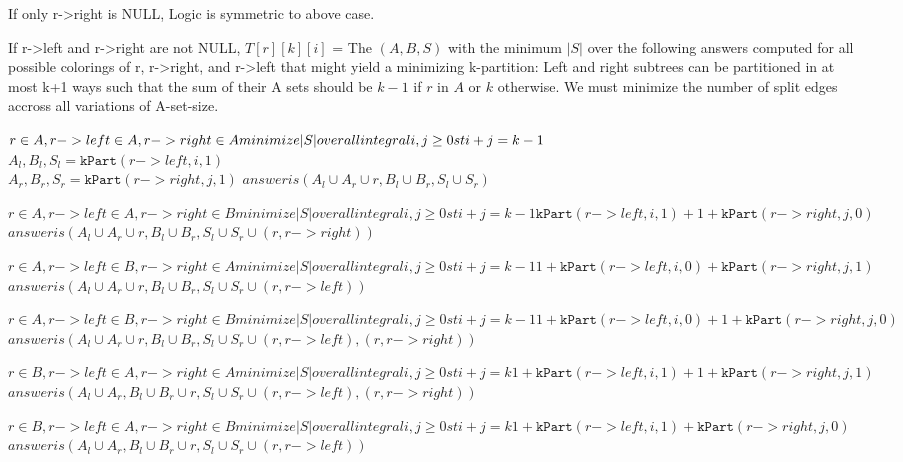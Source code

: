 \documentclass[11pt]{article}
\begin{document}
    If only r->right is NULL,
        Logic is symmetric to above case.

    If r->left and r->right are not NULL,
        $T[r][k][i]$ = The $(A,B,S)$ with the minimum $|S|$ over the following answers computed for all possible colorings of r, r->right, and r->left that might yield a minimizing k-partition:
                Left and right subtrees can be partitioned in at most k+1 ways such that the sum of their A sets should be $k-1$ if $r$ in $A$ or $k$ otherwise.
                We must minimize the number of split edges accross all variations of A-set-size.

          $r \in A, r->left \in A, r->right \in A\\
              minimize |S| over all integral i,j \geq 0 st i+j = k-1$\\
                $A_l, B_l, S_l = \mathtt{kPart}(r->left,i,1)$\\
                $A_r, B_r, S_r = \mathtt{kPart}(r->right,j,1)$
                $answer is (A_l \cup A_r \cup {r},B_l \cup B_r,S_l \cup S_r)$

          $r \in A, r->left \in A, r->right \in B
              minimize |S| over all integral i,j \geq 0 st i+j = k-1
                    \mathtt{kPart}(r->left,i,1) + 1 + \mathtt{kPart}(r->right,j,0)$
                $answer is (A_l \cup A_r \cup {r},B_l \cup B_r,S_l \cup S_r \cup {(r, r->right)})$

          $r \in A, r->left \in B, r->right \in A
              minimize |S| over all integral i,j \geq 0 st i+j = k-1
                1 + \mathtt{kPart}(r->left,i,0) +     \mathtt{kPart}(r->right,j,1)$
                $answer is (A_l \cup A_r \cup {r},B_l \cup B_r,S_l \cup S_r \cup {(r, r->left)})$

          $r \in A, r->left \in B, r->right \in B
              minimize |S| over all integral i,j \geq 0 st i+j = k-1
                1 + \mathtt{kPart}(r->left,i,0) + 1 + \mathtt{kPart}(r->right,j,0)$
                $answer is (A_l \cup A_r \cup {r},B_l \cup B_r,S_l \cup S_r \cup {(r, r->left),(r, r->right)})$

          $r \in B, r->left \in A, r->right \in A
              minimize |S| over all integral i,j \geq 0 st i+j = k
                1 + \mathtt{kPart}(r->left,i,1) + 1 + \mathtt{kPart}(r->right,j,1)$
                $answer is (A_l \cup A_r,B_l \cup B_r \cup {r},S_l \cup S_r \cup {(r, r->left),(r, r->right)})$

          $r \in B, r->left \in A, r->right \in B
              minimize |S| over all integral i,j \geq 0 st i+j = k
                1 + \mathtt{kPart}(r->left,i,1) +     \mathtt{kPart}(r->right,j,0)$
                $answer is (A_l \cup A_r,B_l \cup B_r \cup {r},S_l \cup S_r \cup {(r, r->left)})$
\end{document}
